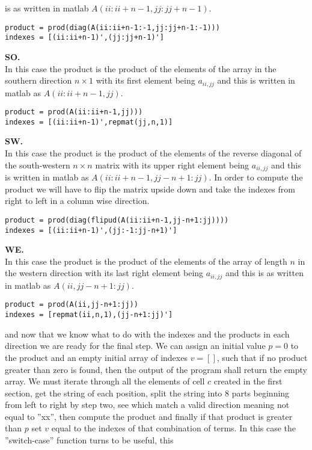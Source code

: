 \documentclass[10pt]{article}
\begin{document}
is as written in {\color{red}matlab} $A(ii:ii+n-1,jj:jj+n-1)$. 
\begin{lstlisting}
product = prod(diag(A(ii:ii+n-1:-1,jj:jj+n-1:-1)))
indexes = [(ii:ii+n-1)',(jj:jj+n-1)']  
\end{lstlisting}
\textbf{{\color{red}SO.}}\\
In this case the product is the product of the elements of the array in the southern
direction $n\times 1$ with its first element being $a_{ii,jj}$ and this is written in 
{\color{red}matlab} as $A(ii:ii+n-1,jj)$. 
\begin{lstlisting}
product = prod(A(ii:ii+n-1,jj)))
indexes = [(ii:ii+n-1)',repmat(jj,n,1)] 
\end{lstlisting}
\textbf{{\color{red}SW.}}\\
In this case the product is the product of the elements of the reverse diagonal of the 
south-western $n\times n$ matrix with its upper right element being $a_{ii,jj}$ and this 
is written in {\color{red}matlab} as $A(ii:ii+n-1,jj-n+1:jj)$. In order to compute the 
product we will have to flip the matrix upside down and take the indexes from right to 
left in a column wise direction.
\begin{lstlisting}
product = prod(diag(flipud(A(ii:ii+n-1,jj-n+1:jj))))
indexes = [(ii:ii+n-1)',(jj:-1:jj-n+1)']  
\end{lstlisting}
\textbf{{\color{red}WE.}}\\
In this case the product is the product of the elements of the array of length $n$ in the 
western direction with its last right element being $a_{ii,jj}$ and this is as written in 
{\color{red}matlab} as $A(ii,jj-n+1:jj)$. 
\begin{lstlisting}
product = prod(A(ii,jj-n+1:jj))
indexes = [repmat(ii,n,1),(jj-n+1:jj)']  
\end{lstlisting}
and now that we know what to do with the indexes and the products in each direction we 
are ready for the final step. We can assign an initial value $p=0$ to the product  and 
an empty initial array of indexes $v = []$, such that if no product greater 
than zero is found, then the output of the program shall return the empty array. We must 
iterate through all the elements of cell $c$ created in the first section, get the string 
of each position, split the string into 8 parts beginning from left to right by step two, 
see which match a valid direction meaning not equal to ''xx'', then compute the product 
and finally if that product is greater than $p$ set $v$ equal to the indexes of that 
combination of terms. In this case the ''switch-case'' function turns to be useful, this 
\end{document}

